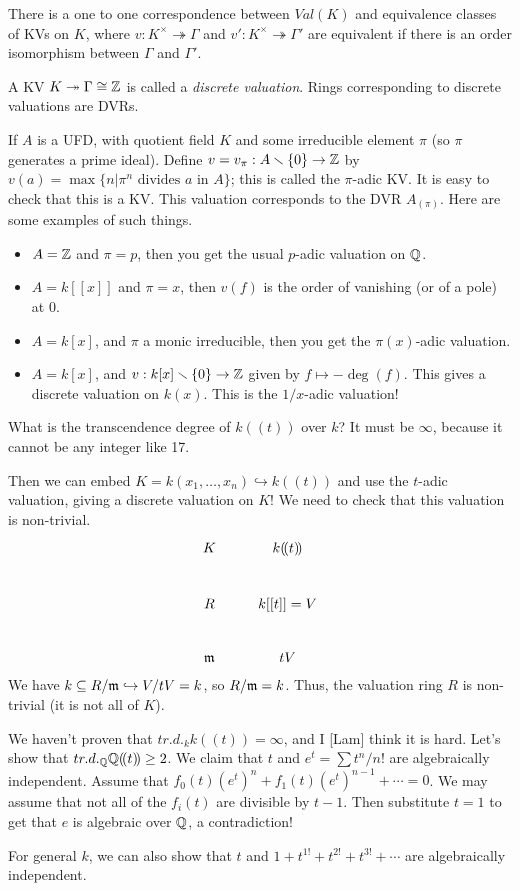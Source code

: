  \begin{corollary}
   There is a one to one correspondence between $Val(K)$ and equivalence classes of KVs
   on $K$, where $v:K^\times\twoheadrightarrow \Gamma$ and $v':K^\times\twoheadrightarrow
   \Gamma'$ are equivalent if there is an order isomorphism between $\Gamma$ and
   $\Gamma'$.
 \end{corollary}
 \begin{definition}
   A KV $K\twoheadrightarrow \Gamma\cong \mathbb{Z}$ is called a \emph{discrete valuation}.
   Rings corresponding to discrete valuations are DVRs.
 \end{definition}
 \begin{example}
   If $A$ is a UFD, with quotient field $K$ and some irreducible element $\pi$ (so $\pi$
   generates a prime ideal). Define $v=v_\pi:A\smallsetminus\{0\}\to \mathbb{Z}$ by
   $v(a)=\max\{n|\pi^n\text{ divides } a \text{ in } A\}$; this is called the $\pi$-adic
   KV. It is easy to check that this is a KV. This valuation corresponds to the DVR
   $A_{(\pi)}$. Here are some examples of such things.
   \begin{itemize}
     \item $A=\mathbb{Z}$ and $\pi=p$, then you get the usual $p$-adic valuation on $\mathbb{Q}$.
     \item $A=k[[x]]$ and $\pi=x$, then $v(f)$ is the order of vanishing (or of a pole) at
     0.
     \item $A=k[x]$, and $\pi$ a monic irreducible, then you get the $\pi(x)$-adic
     valuation.
     \item $A=k[x]$, and $v:k[x]\smallsetminus\{0\}\to \mathbb{Z}$ given by $f\mapsto -\deg(f)$.
     This gives a discrete valuation on $k(x)$. This is the $1/x$-adic valuation!
   \end{itemize}
 \end{example}
 \begin{example}
   What is the transcendence degree of $k(\!(t)\!)$ over $k$? It must be $\infty$,
   because it cannot be any integer like 17.

   Then we can embed $K=k(x_1,\dots, x_n)\hookrightarrow k(\!(t)\!)$ and use the $t$-adic
   valuation, giving a discrete valuation on $K$! We need to check that this valuation is
   non-trivial.
   \[\xymatrix{
    K & k(\!(t)\!)\\
    R & k[[t]]=V\\
    \m & tV
   }\]
   We have $k\subseteq R/\mathfrak{m}\hookrightarrow V/tV=k$, so $R/\mathfrak{m}=k$. Thus, the valuation ring
   $R$ is non-trivial (it is not all of $K$).
 \end{example}

 We haven't proven that $tr.d._k k(\!(t)\!)=\infty$, and I [Lam] think it is hard. Let's
 show that $tr.d._{\mathbb{Q}} \mathbb{Q}(\!(t)\!)\ge 2$. We claim that $t$ and $e^t=\sum t^n/n!$ are
 algebraically independent. Assume that $f_0(t)(e^t)^n + f_1(t)(e^t)^{n-1}+\cdots =0$. We
 may assume that not all of the $f_i(t)$ are divisible by $t-1$. Then substitute $t=1$ to
 get that $e$ is algebraic over $\mathbb{Q}$, a contradiction!

 For general $k$, we can also show that $t$ and $1+t^{1!}+t^{2!}+t^{3!}+\cdots$ are
 algebraically independent.
